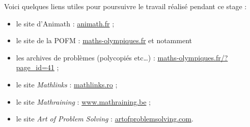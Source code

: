 
\bigskip

Voici quelques liens utiles pour poursuivre le travail réalisé pendant ce stage :
\begin{itemize}
\item le site d'Animath : \href{http://www.animath.fr}{animath.fr} ;
\item le site de la POFM : \href {http://www.maths-olympiques.fr}{maths-olympiques.fr} et notamment
\item les archives de problèmes (polycopiés etc\ldots) : \href{http://www.maths-olympiques.fr/?page_id=41}{maths-olympiques.fr/?page\_id=41} ;
\item le site \emph{Mathlinks} : \href{http://www.mathlinks.ro}{mathlinks.ro} ;
\item le site \emph{Mathraining} : \href{http://www.mathraining.be}{www.mathraining.be} ;
\item le site \emph{Art of Problem Solving} : \href{https://www.artofproblemsolving.com}{artofproblemsolving.com}.
\end{itemize}
